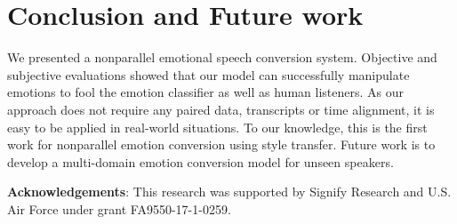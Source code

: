 \documentclass{article}
\begin{document}

\section{Conclusion and Future work}
\label{sec:con}
We presented a nonparallel emotional speech conversion system. Objective and subjective evaluations showed that our model can successfully manipulate emotions to fool the emotion classifier as well as human listeners. As our approach does not require any paired data, transcripts or time alignment, it is easy to be applied in real-world situations. To our knowledge, this is the first work for nonparallel emotion conversion using style transfer. Future work is to develop a multi-domain emotion conversion model for unseen speakers.

\noindent\textbf{Acknowledgements}: This research was supported by Signify Research and U.S. Air Force under grant FA9550-17-1-0259.






\end{document}
